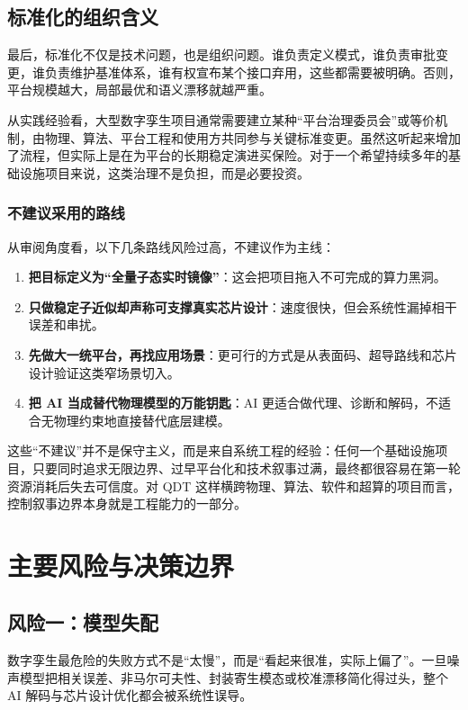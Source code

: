 \documentclass[11pt,a4paper]{article}
\newcommand{\QDT}{QDT}
\begin{document}
\subsection{标准化的组织含义}

最后，标准化不仅是技术问题，也是组织问题。谁负责定义模式，谁负责审批变更，谁负责维护基准体系，谁有权宣布某个接口弃用，这些都需要被明确。否则，平台规模越大，局部最优和语义漂移就越严重。

从实践经验看，大型数字孪生项目通常需要建立某种“平台治理委员会”或等价机制，由物理、算法、平台工程和使用方共同参与关键标准变更。虽然这听起来增加了流程，但实际上是在为平台的长期稳定演进买保险。对于一个希望持续多年的基础设施项目来说，这类治理不是负担，而是必要投资。

\subsubsection{不建议采用的路线}

从审阅角度看，以下几条路线风险过高，不建议作为主线：

\begin{enumerate}
  \item \textbf{把目标定义为“全量子态实时镜像”}：这会把项目拖入不可完成的算力黑洞。
  \item \textbf{只做稳定子近似却声称可支撑真实芯片设计}：速度很快，但会系统性漏掉相干误差和串扰。
  \item \textbf{先做大一统平台，再找应用场景}：更可行的方式是从表面码、超导路线和芯片设计验证这类窄场景切入。
  \item \textbf{把 AI 当成替代物理模型的万能钥匙}：AI 更适合做代理、诊断和解码，不适合无物理约束地直接替代底层建模。
\end{enumerate}

这些“不建议”并不是保守主义，而是来自系统工程的经验：任何一个基础设施项目，只要同时追求无限边界、过早平台化和技术叙事过满，最终都很容易在第一轮资源消耗后失去可信度。对 \QDT{} 这样横跨物理、算法、软件和超算的项目而言，控制叙事边界本身就是工程能力的一部分。

\section{主要风险与决策边界}

\subsection{风险一：模型失配}

数字孪生最危险的失败方式不是“太慢”，而是“看起来很准，实际上偏了”。一旦噪声模型把相关误差、非马尔可夫性、封装寄生模态或校准漂移简化得过头，整个 AI 解码与芯片设计优化都会被系统性误导。
\end{document}
